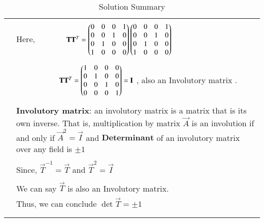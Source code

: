 \begin{longtable}{|p{5cm}|p{13cm}|}
	&\\
	& Here, $\qquad\qquad\mathbf{T}\mathbf{T}^{T}=\begin{pmatrix}0&0&0&1\\0&0&1&0\\0&1&0&0\\1&0&0&0\end{pmatrix}\begin{pmatrix}0&0&0&1\\0&0&1&0\\0&1&0&0\\1&0&0&0\end{pmatrix}$\\
	&\\
	&$\qquad\qquad\qquad\mathbf{T}\mathbf{T}^{T}=\begin{pmatrix}1&0&0&0\\0&1&0&0\\0&0&1&0\\0&0&0&1\end{pmatrix} = \mathbf{I}$ , also an Involutory matrix .\\
	&\\
	& \textbf{Involutory matrix}: an involutory matrix is a matrix that is its own inverse. That is, multiplication by matrix $\vec{A}$ is an involution if and only if               $\vec{A}^{2}=\vec{I}$ and $\textbf{Determinant}$ of an involutory matrix over any field is $\pm1$\\
	&\\
	
	& Since, $\vec{T}^{-1}=\vec{T}$ and $\vec{T}^2=\vec{I}$\\
	&\\
	& We can say $\vec{T}$ is also an Involutory matrix.\\
	& Thus, we can conclude $\det{\vec{T}}=\pm1$\\
	&\\
	\hline
	\caption{Solution Summary}
    \label{eq:solutions/2015/dec/72/table:2}
\end{longtable}

\twocolumn
